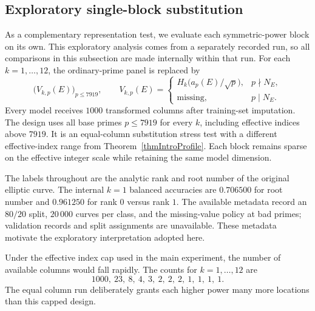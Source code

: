 \documentclass[12pt,reqno]{amsart}
\numberwithin{equation}{section}
\theoremstyle{plain}
\theoremstyle{definition}
\theoremstyle{remark}
\begin{document}
\FloatBarrier

\subsection{Exploratory single-block substitution}
\label{secNegative}

As a complementary representation test, we evaluate each symmetric-power block on its own.
This exploratory analysis comes from a separately recorded run, so all comparisons in this subsection are made internally within that run.
For each $k=1,\ldots,12$, the ordinary-prime panel is replaced by
\begin{equation*}
\bigl(V_{k,p}(E)\bigr)_{p\leq7919},
\qquad
V_{k,p}(E)=
\begin{cases}
H_k\bigl(a_p(E)/\sqrt p\bigr),&p\nmid N_E,\\
\text{missing},&p\mid N_E.
\end{cases}
\end{equation*}
Every model receives $1000$ transformed columns after training-set imputation.
The design uses all base primes $p\leq7919$ for every $k$, including effective indices above $7919$.
It is an equal-column substitution stress test with a different effective-index range from Theorem~\ref{thmIntroProfile}.
Each block remains sparse on the effective integer scale while retaining the same model dimension.

The labels throughout are the analytic rank and root number of the original elliptic curve.
The internal $k=1$ balanced accuracies are $0.706500$ for root number and $0.961250$ for rank $0$ versus rank $1$.
The available metadata record an $80/20$ split, $20\,000$ curves per class, and the missing-value policy at bad primes; validation records and split assignments are unavailable.
These metadata motivate the exploratory interpretation adopted here.

Under the effective index cap used in the main experiment, the number of available columns would fall rapidly.
The counts for $k=1,\ldots,12$ are
\begin{equation*}
1000,\ 23,\ 8,\ 4,\ 3,\ 2,\ 2,\ 2,\ 1,\ 1,\ 1,\ 1.
\end{equation*}
The equal column run deliberately grants each higher power many more locations than this capped design.
\end{document}
